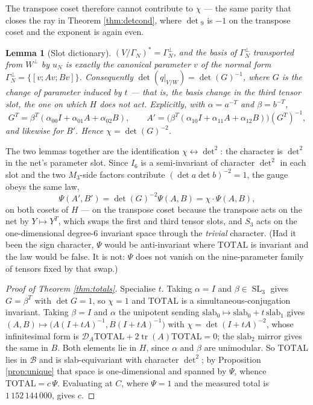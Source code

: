 \documentclass[11pt,reqno]{amsart}
\theoremstyle{plain}
\newtheorem{lemma}[theorem]{Lemma}
\theoremstyle{definition}
\DeclareMathOperator{\SL}{SL}
\DeclareMathOperator{\tr}{tr}
\begin{document}
The transpose coset therefore cannot contribute to $\chi$ --- the same parity
that closes the ray in Theorem \ref{thm:detcond}, where $\det{}_9$ is $-1$ on
the transpose coset and the exponent is again even.

\begin{lemma}[Slot dictionary]\label{lem:slot}
$(V/\Gamma_N)^{*}=\Gamma_N^{\perp}$, and the basis of $\Gamma_N^{\perp}$
transported from $W^{\perp}$ by $u_N$ is exactly the canonical parameter $v$ of
the normal form $\Gamma_N^{\perp}=\{[v;Av;Bv]\}$.  Consequently
$\det(q|_{V/W})=\det(G)^{-1}$, where $G$ is the change of parameter induced by
$t$ --- that is, the basis change in the \emph{third tensor slot}, the one on
which $H$ does not act.  Explicitly, with $\alpha=a^{-T}$ and $\beta=b^{-T}$,
\[
  G^{T}=\beta^{T}(\alpha_{00}I+\alpha_{01}A+\alpha_{02}B),\qquad
  A'=\bigl(\beta^{T}(\alpha_{10}I+\alpha_{11}A+\alpha_{12}B)\bigr)(G^{T})^{-1},
\]
and likewise for $B'$.  Hence $\chi=\det(G)^{-2}$.
\end{lemma}

The two lemmas together are the identification $\chi\leftrightarrow\det^{2}$:
the character is $\det^{2}$ in the net's parameter slot.  Since $I_6$ is a
semi-invariant of character $\det^{2}$ in each slot and the two $M_3$-side
factors contribute $(\det a\det b)^{-2}=1$, the gauge obeys the same law,
\[
  \Psi(A',B')=\det(G)^{-2}\Psi(A,B)=\chi\cdot\Psi(A,B),
\]
on both cosets of $H$ --- on the transpose coset because the transpose acts on
the net by $Y\mapsto Y^{T}$, which swaps the first and third tensor slots, and
$S_3$ acts on the one-dimensional degree-$6$ invariant space through the
\emph{trivial} character.  (Had it been the sign character, $\Psi$ would be
anti-invariant where $\mathrm{TOTAL}$ is invariant and the law would be false.
It is not: $\Psi$ does not vanish on the nine-parameter family of tensors fixed
by that swap.)

\begin{proof}[Proof of Theorem \ref{thm:totals}]
Specialise $t$.  Taking $\alpha=I$ and $\beta\in\SL_3$ gives $G=\beta^{T}$ with
$\det G=1$, so $\chi=1$ and $\mathrm{TOTAL}$ is a simultaneous-conjugation
invariant.  Taking $\beta=I$ and $\alpha$ the unipotent sending
$\mathrm{slab}_0\mapsto\mathrm{slab}_0+t\,\mathrm{slab}_1$ gives
$(A,B)\mapsto\bigl(A(I+tA)^{-1},B(I+tA)^{-1}\bigr)$ with
$\chi=\det(I+tA)^{-2}$, whose infinitesimal form is
$\mathcal D_A\mathrm{TOTAL}+2\tr(A)\mathrm{TOTAL}=0$; the $\mathrm{slab}_2$
mirror gives the same in $B$.  Both elements lie in $H$, since $\alpha$ and
$\beta$ are unimodular.  So $\mathrm{TOTAL}$ lies in $\mathcal B$ and is
slab-equivariant with character $\det^{2}$; by Proposition \ref{prop:unique}
that space is one-dimensional and spanned by $\Psi$, whence
$\mathrm{TOTAL}=c\,\Psi$.  Evaluating at $C$, where $\Psi=1$ and the measured
total is $1\,152\,144\,000$, gives $c$.
\end{proof}
\end{document}
